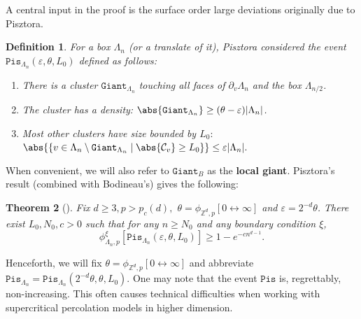 \documentclass[article,11pt,reqno]{amsart}
\newcommand{\cc}{\leftrightarrow}
\newcommand{\Giant}{\mathtt{Giant}}
\newtheorem{theorem}{Theorem}[section]
\newtheorem{definition}[theorem]{Definition}
\begin{document}
A central input in the proof is the surface order large deviations originally due to Pisztora. 

\begin{definition}\label{def:Pisztora_event}
For a box $\Lambda_n$ (or a translate of it), Pisztora considered the event $\mathtt{Pis}_{\Lambda_n}(\varepsilon, \theta, L_0)$ defined as follows:
\begin{enumerate}
    \item[$i)$] There is a cluster $\Giant_{\Lambda_n} $ touching all faces of $\partial_v \Lambda_n$ and the box $\Lambda_{n/2}$. 
    \item[$ii)$] The cluster has a density: $\abs{\Giant_{\Lambda_n}}\geq (\theta- \varepsilon)|\Lambda_n|$.
    \item[$iii)$] Most other clusters have size bounded by $L_0:$ $\abs{ \left \{v \in \Lambda_n \setminus \mathtt{Giant}_{\Lambda_n} \mid \abs{\mathcal{C}_v} \geq L_0 \right \} } \leq \varepsilon |\Lambda_n|.$
\end{enumerate}
\end{definition}

When convenient, we will also refer to $\Giant_B$ as the \textbf{local giant}.
Pisztora's result  (combined  with Bodineau's) gives the following:
\begin{theorem}[\cite{Pis96}]\label{thm:pisztora}
Fix $d \geq 3, p > p_c(d),$ $\theta=\phi_{\mathbb{Z}^d,p}[0\cc \infty]$ and $\varepsilon = 2^{-d}\theta$. There exist  $L_0, N_0, c >0$ such that for any $n \geq N_0$ and any boundary condition $\xi$,
$$
\phi_{{\Lambda_n},p}^{\xi}[\mathtt{Pis}_{\Lambda_n}(\varepsilon, \theta, L_0) ] \geq 1 - e^{-c n^{d-1}}.
$$
\end{theorem}
Henceforth, we will fix $\theta=\phi_{\mathbb{Z}^d,p}[0\cc\infty]$ and abbreviate $\mathtt{Pis}_{\Lambda_n}=\mathtt{Pis}_{\Lambda_n}(2^{-d}\theta,\theta, L_0)$. One may note that the event $\mathtt{Pis}$ is, regrettably, non-increasing. This often causes technical difficulties when working with supercritical percolation models in higher dimension.
\end{document}
